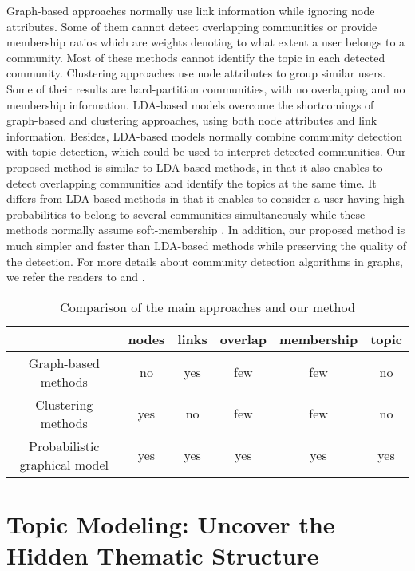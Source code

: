 Graph-based approaches normally use link information while ignoring node attributes. Some of them cannot detect overlapping communities or provide membership ratios which are weights denoting to what extent a user belongs to a community. Most of these methods cannot identify the topic in each detected community. Clustering approaches use node attributes to group similar users. Some of their results are hard-partition communities, with no overlapping and no membership information. LDA-based models overcome the shortcomings of graph-based and clustering approaches, using both node attributes and link information. Besides, LDA-based models normally combine community detection with topic detection, which could be used to interpret detected communities. Our proposed method is similar to LDA-based methods, in that it also enables to detect overlapping communities and identify the topics at the same time. It differs from LDA-based methods in that it enables to consider a user having high probabilities to belong to several communities simultaneously while these methods normally assume soft-membership \cite{yang2013community}. In addition, our proposed method is much simpler and faster than LDA-based methods while preserving the quality of the detection.
For more details about community detection algorithms in graphs, we refer the readers to \cite{fortunato2010community} and \cite{DBLP:journals/csur/XieKS13}.
\begin{table}[htp]
\caption{Comparison of the main approaches and our method}
\label{tab:methodcomparison}
\centering
\begin{tabular}{|c|c|c|c|c|c|}
\hline
 &nodes &links & overlap & membership & topic\\
\hline
Graph-based methods & no & yes & few & few &no\\
\hline
Clustering methods & yes & no & few & few &no\\
\hline
Probabilistic graphical model& yes & yes & yes & yes &yes\\
\hline
\end{tabular}
\end{table}



\section{Topic Modeling: Uncover the Hidden Thematic Structure}

